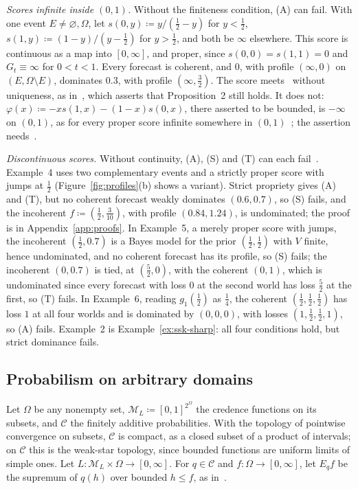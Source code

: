 \documentclass[11pt]{article}
\theoremstyle{definition}
\theoremstyle{remark}
\newcommand{\M}{\mathcal M}
\newcommand{\C}{\mathcal C}
\begin{document}
\emph{Scores infinite inside $(0,1)$.} Without the finiteness condition, (A) can fail. With one event $E\ne\varnothing,\Omega$, let $s(0,y)\coloneqq y/(\frac12-y)$ for $y<\frac12$, $s(1,y)\coloneqq(1-y)/(y-\frac12)$ for $y>\frac12$, and both be $\infty$ elsewhere. This score is continuous as a map into $[0,\infty]$, and proper, since $s(0,0)=s(1,1)=0$ and $G_t\equiv\infty$ for $0<t<1$. Every forecast is coherent, and $0$, with profile $(\infty,0)$ on $(E,\Omega\setminus E)$, dominates $0.3$, with profile $(\infty,\frac32)$. The score meets~\cite[Definition~2]{Predd} without uniqueness, as in~\cite[Section~VII.B.1]{Predd}, which asserts that Proposition~2 still holds. It does not: $\varphi(x)\coloneqq-xs(1,x)-(1-x)s(0,x)$, there asserted to be bounded, is $-\infty$ on $(0,1)$, as for every proper score infinite somewhere in $(0,1)$~\cite[Lemma~3]{SSK09}; the assertion needs~\cite[Assumption~3]{SSK09}.

\emph{Discontinuous scores.} Without continuity, (A), (S) and (T) can each fail~\cite[Examples~4--6]{SSK09}. Example~4 uses two complementary events and a strictly proper score with jumps at $\frac12$ (Figure~\ref{fig:profiles}(b) shows a variant). Strict propriety gives (A) and (T), but no coherent forecast weakly dominates $(0.6,0.7)$, so (S) fails, and the incoherent $f\coloneqq(\frac12,\frac3{10})$, with profile $(0.84,1.24)$, is undominated; the proof is in Appendix~\ref{app:proofs}. In Example~5, a merely proper score with jumps, the incoherent $(\frac12,0.7)$ is a Bayes model for the prior $(\frac12,\frac12)$ with $V$ finite, hence undominated, and no coherent forecast has its profile, so (S) fails; the incoherent $(0,0.7)$ is tied, at $(\frac52,0)$, with the coherent $(0,1)$, which is undominated since every forecast with loss $0$ at the second world has loss $\frac52$ at the first, so (T) fails. In Example~6, reading $g_1(\frac12)$ as $\frac14$, the coherent $(\frac12,\frac12,\frac12)$ has loss $1$ at all four worlds and is dominated by $(0,0,0)$, with losses $(1,\frac12,\frac12,1)$, so (A) fails. Example~2 is Example~\ref{ex:ssk-sharp}: all four conditions hold, but strict dominance fails.

\subsection{Probabilism on arbitrary domains}\label{sec:nielsen}
Let $\Omega$ be any nonempty set, $\M_L\coloneqq[0,1]^{2^\Omega}$ the credence functions on its subsets, and $\C$ the finitely additive probabilities. With the topology of pointwise convergence on subsets, $\C$ is compact, as a closed subset of a product of intervals; on $\C$ this is the weak-star topology, since bounded functions are uniform limits of simple ones. Let $L:\M_L\times\Omega\to[0,\infty]$. For $q\in\C$ and $f:\Omega\to[0,\infty]$, let $E_qf$ be the supremum of $q(h)$ over bounded $h\le f$, as in~\cite[Appendix~A]{Nielsen}.
\end{document}
